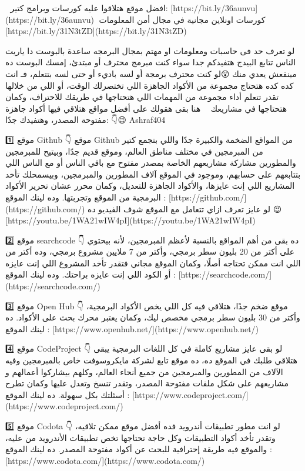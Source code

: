     🥀 افضل موقع هتلاقوا عليه كورسات وبرامج كتير:
    [https://bit.ly/36aunvu](https://bit.ly/36aunvu)
    🥀كورسات اونلاين مجانية في مجال أمن المعلومات
    [https://bit.ly/31N3tZD](https://bit.ly/31N3tZD)
    
    لو تعرف حد فى حاسبات ومعلومات او مهتم بمجال البرمجه ساعدة بالبوست دا
    ياريت الناس تتابع البيدج هتفيدكم جدا
    سواء كنت مبرمج محترف أو مبتدئ، إمسك البوست ده مينفعش يعدي منك 😲لو كنت محترف برمجة أو لسه باديء أو حتى لسه بتتعلم، فـ انت كده كده هتحتاج مجموعة من الأكواد الجاهزة اللي تختصرلك الوقت، أو اللي من خلالها تقدر تتعلم أداء مجموعة من المهمات اللي هتحتاجها في طريقك للاحتراف، وكمان هتحتاجها في مشاريعك 👨‍💻
    هنا بقى هقولك على أفضل مواقع هتلاقي فيها أكواد جاهزة مفتوحة المصدر، وهتفيدك جدًا: 👇😉 Ashraf404
    
    1️⃣️ موقع Github 👇
    موقع Github من المواقع الضخمة والكبيرة جدًا واللي بتجمع كتير من المبرمجين في مختلف مناطق العالم، وموقع قديم جدًا، وبيتيح للمبرمجين والمطورين مشاركة مشاريعهم الخاصة بمصدر مفتوح مع باقي الناس أو مع الناس اللي بتتابعهم على حسابهم، وموجود في الموقع آلاف المطورين والمبرمجين، وبيسمحلك تأخد المشاريع اللي إنت عايزها، والأكواد الجاهزة للتعديل، وكمان محرر عشان تحرير الأكواد البرمجية من الموقع وتجربتها.
    وده لينك الموقع : [https://github.com/](https://github.com/)
    لو عايز تعرف ازاي تتعامل مع الموقع شوف الفيديو ده 😉 [https://youtu.be/1WA21wIW4pI](https://youtu.be/1WA21wIW4pI)
    
    2️⃣️ موقع searchcode 👇
    ده بقى من أهم المواقع بالنسبة لأعظم المبرمجين، لأنه بيحتوي على أكتر من 20 بليون سطر برمجي، وأكتر من 7 ملايين مشروع برمجي، وده أكتر من اللي انت ممكن تحتاجه أصلًا، وكمان الموقع مجاني فتقدر تأخد المشروع اللي إنت عايزه أو الكود اللي إنت عايزه براحتك.
    وده لينك الموقع : [https://searchcode.com/](https://searchcode.com/)
    
    3️⃣️ موقع Open Hub 👇
    موقع ضخم جدًا، هتلاقي فيه كل اللي يخص الأكواد البرمجية، وأكتر من 30 بليون سطر برمجي مخصص ليك، وكمان يعتبر محرك بحث على الأكواد.
    ده لينك الموقع : [https://www.openhub.net/](https://www.openhub.net/)
    
    4️⃣️ موقع CodeProject 👇
    لو بقى عايز مشاريع كاملة في كل اللغات البرمجية يبقى هتلاقي طلبك في الموقع ده، ده موقع تابع لشركة مايكروسوفت خاص بالمبرمجين وفيه الآلاف من المطورين والمبرمجين من جميع أنحاء العالم، وكلهم بيشاركوا أعمالهم و مشاريعهم على شكل ملفات مفتوحة المصدر، وتقدر تنسخ وتعدل عليها وكمان تطرح أسئلتك بكل سهولة.
    ده لينك الموقع : [https://www.codeproject.com/](https://www.codeproject.com/)
    
    5️⃣️ موقع Codota 👇
    لو انت مطور تطبيقات أندرويد فده أفضل موقع ممكن تلاقيه، وتقدر تأخد أكواد التطبيقات وكل حاجة تحتاجها تخص تطبيقات الأندرويد من عليه، والموقع فيه طريقة إحترافية للبحث عن أكواد مفتوحة المصدر.
    ده لينك الموقع : [https://www.codota.com/](https://www.codota.com/)
    
